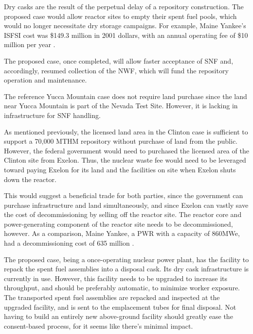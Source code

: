 Dry casks are the result of the perpetual delay of a repository construction.
The proposed case would allow reactor sites to empty their spent fuel pools, which
would no longer necessitate dry storage campaigns. For example, Maine Yankee's 
\gls{ISFSI} cost was \$149.3 million in 2001 dollars, with an annual operating fee
of \$10 million per year \cite{lee_costing_2009}. 

The proposed case, once completed, will allow faster acceptance of \gls{SNF} and, 
accordingly, resumed collection of the \gls{NWF}, 
which will fund the repository operation and maintenance.

  The reference Yucca Mountain case does not require land purchase 
  since the land near Yucca Mountain is part of the Nevada Test Site. However, 
  it is lacking in infrastructure for \gls{SNF} handling.
  
  As mentioned previously, the licensed land area in the Clinton case is 
  sufficient to support a 70,000 MTHM repository without purchase of land from 
  the public.  However, the federal government would need to purchased the 
  licensed area of the Clinton site from Exelon. Thus, the nuclear waste fee 
  would need to be leveraged toward paying Exelon for its land and the 
  facilities on site when Exelon shuts down the reactor.

  This would suggest a beneficial trade for both parties, since the government
  can purchase infrastructure and land simultaneously, and since Exelon can vastly
  save the cost of decommissioning by selling off the reactor site. The reactor
  core and power-generating component of the reactor site needs to be decommissioned,
  however. As a comparison, Maine Yankee, a \gls{PWR} with a capacity of 860MWe, had a
  decommissioning cost of 635 million \cite{aker_maine_2004}.





The proposed case, being a once-operating nuclear power plant, has the facility to 
repack the spent fuel assemblies into a disposal cask. Its dry cask infrastructure 
is currently in use. However, this facility needs to be upgraded to increase its throughput, and should be preferably automatic, to minimize worker exposure. The transported spent fuel assemblies are repacked and inspected at the upgraded facility, and is sent to the emplacement tubes for final disposal. Not having to build an entirely new above-ground facility should greatly ease the consent-based process, for it seems like there's minimal impact. 
 
